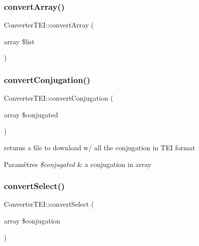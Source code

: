 \subsubsection{\texorpdfstring{convert\+Array()}{convertArray()}}
{\footnotesize\ttfamily Converter\+T\+E\+I\+::convert\+Array (\begin{DoxyParamCaption}\item[{array}]{\$list }\end{DoxyParamCaption})}

\hypertarget{class_converter_t_e_i_a33798e9ea3e043efe980706e39e160d4}{}\label{class_converter_t_e_i_a33798e9ea3e043efe980706e39e160d4} 
\subsubsection{\texorpdfstring{convert\+Conjugation()}{convertConjugation()}}
{\footnotesize\ttfamily Converter\+T\+E\+I\+::convert\+Conjugation (\begin{DoxyParamCaption}\item[{array}]{\$conjugated }\end{DoxyParamCaption})}

returns a file to download w/ all the conjugation in T\+EI format 
\begin{DoxyParams}{Paramètres}
{\em \$conjugated} & a conjugation in array \\
\hline
\end{DoxyParams}
\hypertarget{class_converter_t_e_i_abb47b4d3c4c9d0787064f23a368ffa6d}{}\label{class_converter_t_e_i_abb47b4d3c4c9d0787064f23a368ffa6d} 
\subsubsection{\texorpdfstring{convert\+Select()}{convertSelect()}}
{\footnotesize\ttfamily Converter\+T\+E\+I\+::convert\+Select (\begin{DoxyParamCaption}\item[{array}]{\$conjugation }\end{DoxyParamCaption})}

\hypertarget{class_converter_t_e_i_a49fd33e0b0401c7bfaef1cca1bcee72c}{}\label{class_converter_t_e_i_a49fd33e0b0401c7bfaef1cca1bcee72c} 
